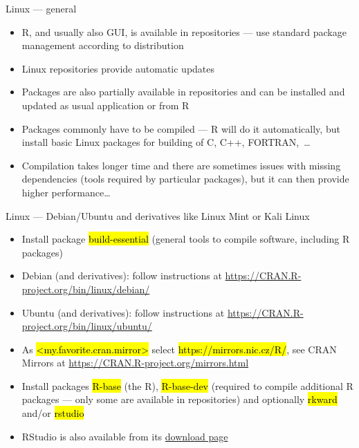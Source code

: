 \documentclass[compress, ucs, xelatex, 11pt, xcolor=svgnames,
	hyperref={
		bookmarks=true,
		unicode=true,
		colorlinks=true,
		pdftitle={Molecular data in R},
		plainpages=false,
		pdfauthor={Vojtech Zeisek},
		pdfsubject={Course about phylogeny and evolution in R},
		pdfcreator={XeLaTeX},
		pdfkeywords={R, evolution, phylogeny, molecular data},
		linkcolor=Tomato,
		anchorcolor=SaddleBrown,
		citecolor=Goldenrod,
		filecolor=DarkMagenta,
		menucolor=Sienna,
		urlcolor=DarkTurquoise,
		pdftex},
	url={hyphens, lowtilde} %
	]{beamer}
\renewcommand{\texttt}[1]{\hl{\ttfamily #1}}
\begin{document}
\begin{frame}{Linux --- general}
	\begin{itemize}
		\item R, and usually also GUI, is available in repositories --- use standard package management according to distribution
		\item Linux repositories provide automatic updates
		\item Packages are also partially available in repositories and can be installed and updated as usual application or from R
		\item Packages commonly have to be compiled --- R will do it automatically, but install basic Linux packages for building of C, C++, FORTRAN,~\ldots
		\item Compilation takes longer time and there are sometimes issues with missing dependencies (tools required by particular packages), but it can then provide higher performance\ldots
	\end{itemize}
\end{frame}

\begin{frame}{Linux --- Debian/Ubuntu and derivatives like Linux Mint or Kali Linux}
	\begin{itemize}
		\item Install package \texttt{build-essential} (general tools to compile software, including R packages)
		\item Debian (and derivatives): follow instructions at \url{https://CRAN.R-project.org/bin/linux/debian/}
		\item Ubuntu (and derivatives): follow instructions at \url{https://CRAN.R-project.org/bin/linux/ubuntu/}
		\item As \texttt{<my.favorite.cran.mirror>} select \alert{\texttt{https://mirrors.nic.cz/R/}}, see \alert{CRAN Mirrors} at \url{https://CRAN.R-project.org/mirrors.html}
		\item Install packages \texttt{R-base} (the R), \texttt{R-base-dev} (required to compile additional R packages --- only some are available in repositories) and optionally \texttt{rkward} and/or \texttt{rstudio}
		\item RStudio is also available from its \href{https://www.rstudio.com/products/rstudio/download/\#download}{download page}
	\end{itemize}
\end{frame}
\end{document}
